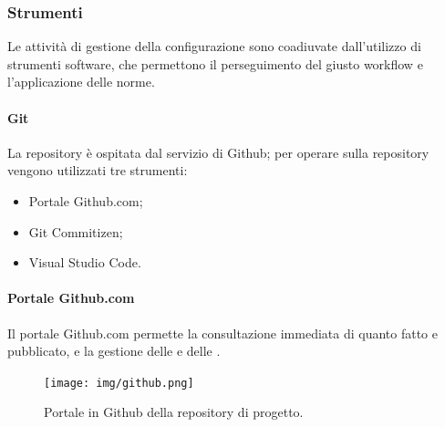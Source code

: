 \documentclass[../norme-di-progetto.tex]{subfiles}
\begin{document}
\subsubsection{Strumenti}
Le attività di gestione della configurazione sono coadiuvate dall'utilizzo di strumenti software, che permettono il perseguimento del giusto workflow e l'applicazione delle norme.
\paragraph{Git}
La repository è ospitata dal servizio di  Github; per operare sulla repository vengono utilizzati tre strumenti:
\begin{itemize}
  \item Portale Github.com;
  \item Git Commitizen;
  \item Visual Studio Code.
\end{itemize}
\paragraph{Portale Github.com}
Il portale Github.com permette la consultazione immediata di quanto fatto e pubblicato, e la gestione delle  e delle .
\begin{figure}[H]
  \centering
  \texttt{[image: img/github.png]}
  \label{fig:github}
  \caption{Portale in Github della repository di progetto.}
\end{figure}
\end{document}
